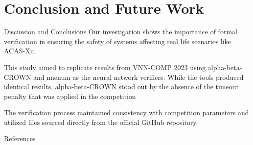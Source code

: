 \documentclass[9pt]{beamer}
\begin{document}
\section{Conclusion and Future Work}
\begin{frame}{Discussion and Conclusions}
  Our investigation shows the importance of formal verification in ensuring the safety of systems affecting real life scenarios like ACAS-Xu.

  \vspace{0.6cm}

  This study aimed to replicate results from VNN-COMP 2023 using alpha-beta-CROWN and nnenum as the neural network verifiers. While the tools produced identical results, alpha-beta-CROWN stood out by the absence of the timeout penalty that was applied in the competition

  \vspace{0.6cm}

  The verification process maintained consistency with competition parameters and utilized files sourced directly from the official GitHub repository.

\end{frame}


\begin{frame}{References}
    


\end{frame}
\end{document}
